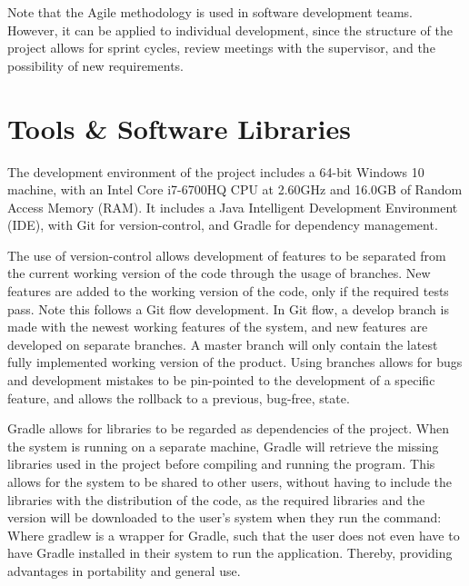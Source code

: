 \par Note that the Agile methodology is used in software development teams. However, it can be applied to individual development, since the structure of the project allows for sprint cycles, review meetings with the supervisor, and the possibility of new requirements.

\section{Tools \& Software Libraries}
\par The development environment of the project includes a 64-bit Windows 10 machine, with an Intel Core i7-6700HQ CPU at 2.60GHz and 16.0GB of Random Access Memory (RAM). It includes a Java Intelligent Development Environment (IDE), with Git for version-control, and Gradle for dependency management. 

\par The use of version-control allows development of features to be separated from the current working version of the code through the usage of branches. New features are added to the working version of the code, only if the required tests pass. Note this follows a Git flow development. In Git flow, a develop branch is made with the newest working features of the system, and new features are developed on separate branches. A master branch will only contain the latest fully implemented working version of the product. Using branches allows for bugs and development mistakes to be pin-pointed to the development of a specific feature, and allows the rollback to a previous, bug-free, state.

\par Gradle allows for libraries to be regarded as dependencies of the project. When the system is running on a separate machine, Gradle will retrieve the missing libraries used in the project before compiling and running the program. This allows for the system to be shared to other users, without having to include the libraries with the distribution of the code, as the required libraries and the version will be downloaded to the user's system when they run the command:
Where gradlew is a wrapper for Gradle, such that the user does not even have to have Gradle installed in their system to run the application. Thereby, providing advantages in portability and general use.

